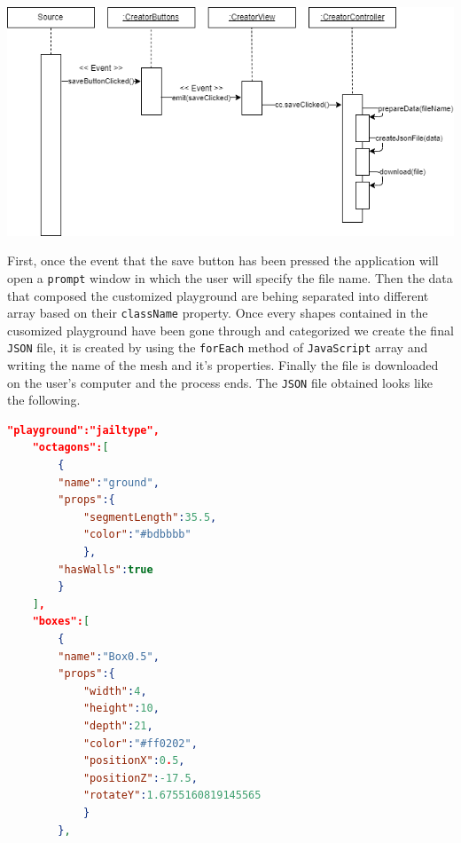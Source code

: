 \documentclass{scrbook}
\begin{document}
\begin{center}
  \includegraphics[width=\textwidth]{./savepg_sd}
\end{center}

First, once the event that the save button has been pressed the application will open a \texttt{prompt} window in which the user will specify the file name. Then the data that composed the customized playground are behing separated into different array based on their \texttt{className} property. 
Once every shapes contained in the cusomized playground have been gone through and categorized we create the final \texttt{JSON} file, it is created by using the \texttt{forEach} method of \texttt{JavaScript} array and writing the name of the mesh and it's properties. 
Finally the file is downloaded on the user's computer and the process ends. The \texttt{JSON} file obtained looks like the following.

\begin{lstlisting}[language=json, basicstyle=\ttfamily\small]
  "playground":"jailtype",
    "octagons":[
        {
        "name":"ground",
        "props":{
            "segmentLength":35.5,
            "color":"#bdbbbb"
            },
        "hasWalls":true
        }
    ],
    "boxes":[
        {
        "name":"Box0.5",
        "props":{
            "width":4,
            "height":10,
            "depth":21,
            "color":"#ff0202",
            "positionX":0.5,
            "positionZ":-17.5,
            "rotateY":1.6755160819145565
            }
        },
\end{lstlisting}
\end{document}
